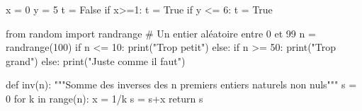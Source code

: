 \begin{pyverbatim}
x = 0
y = 5
t = False
if x>=1:
t = True
if y <= 6:
t = True
\end{pyverbatim}

\begin{pyverbatim}
from random import randrange
# Un entier aléatoire entre 0 et 99
n = randrange(100) 
if n <= 10:
    print("Trop petit")
else:
    if n >= 50:
        print("Trop grand")
    else:
        print("Juste comme il faut")
\end{pyverbatim}



\begin{pyverbatim}
def inv(n):
    """Somme des inverses des n premiers 
       entiers naturels non nuls"""
    s = 0
    for k in range(n):
        x = 1/k
    s = s+x
    return s
\end{pyverbatim}